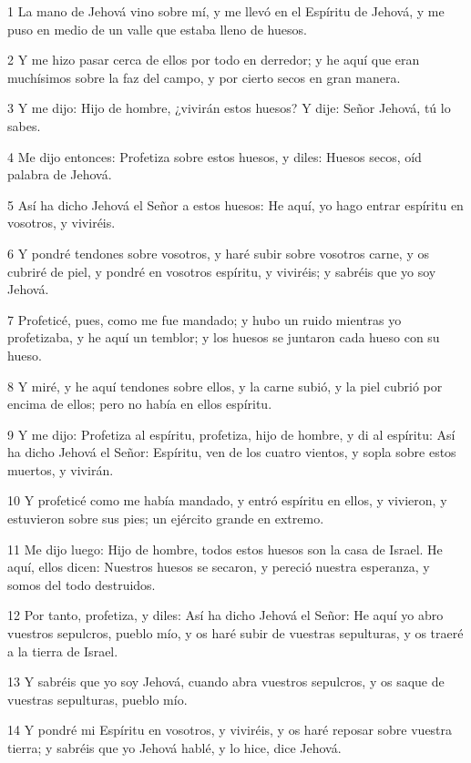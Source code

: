 \par 1 La mano de Jehová vino sobre mí, y me llevó en el Espíritu de Jehová, y me puso en medio de un valle que estaba lleno de huesos.
\par 2 Y me hizo pasar cerca de ellos por todo en derredor; y he aquí que eran muchísimos sobre la faz del campo, y por cierto secos en gran manera.
\par 3 Y me dijo: Hijo de hombre, ¿vivirán estos huesos? Y dije: Señor Jehová, tú lo sabes.
\par 4 Me dijo entonces: Profetiza sobre estos huesos, y diles: Huesos secos, oíd palabra de Jehová.
\par 5 Así ha dicho Jehová el Señor a estos huesos: He aquí, yo hago entrar espíritu en vosotros, y viviréis.
\par 6 Y pondré tendones sobre vosotros, y haré subir sobre vosotros carne, y os cubriré de piel, y pondré en vosotros espíritu, y viviréis; y sabréis que yo soy Jehová.
\par 7 Profeticé, pues, como me fue mandado; y hubo un ruido mientras yo profetizaba, y he aquí un temblor; y los huesos se juntaron cada hueso con su hueso.
\par 8 Y miré, y he aquí tendones sobre ellos, y la carne subió, y la piel cubrió por encima de ellos; pero no había en ellos espíritu.
\par 9 Y me dijo: Profetiza al espíritu, profetiza, hijo de hombre, y di al espíritu: Así ha dicho Jehová el Señor: Espíritu, ven de los cuatro vientos, y sopla sobre estos muertos, y vivirán. 
\par 10 Y profeticé como me había mandado, y entró espíritu en ellos, y vivieron, y estuvieron sobre sus pies; un ejército grande en extremo.
\par 11 Me dijo luego: Hijo de hombre, todos estos huesos son la casa de Israel. He aquí, ellos dicen: Nuestros huesos se secaron, y pereció nuestra esperanza, y somos del todo destruidos.
\par 12 Por tanto, profetiza, y diles: Así ha dicho Jehová el Señor: He aquí yo abro vuestros sepulcros, pueblo mío, y os haré subir de vuestras sepulturas, y os traeré a la tierra de Israel.
\par 13 Y sabréis que yo soy Jehová, cuando abra vuestros sepulcros, y os saque de vuestras sepulturas, pueblo mío.
\par 14 Y pondré mi Espíritu en vosotros, y viviréis, y os haré reposar sobre vuestra tierra; y sabréis que yo Jehová hablé, y lo hice, dice Jehová.

